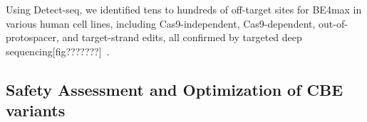 \documentclass[12pt]{article}
\begin{document}
Using Detect-seq, we identified tens to hundreds of off-target sites for BE4max in various human cell lines, 
including Cas9-independent, Cas9-dependent, out-of-protospacer, and target-strand edits, 
all confirmed by targeted deep sequencing[fig???????]~\cite{lei2021detect}. 


  
\subsection*{Safety Assessment and Optimization of CBE variants}





\end{document}

